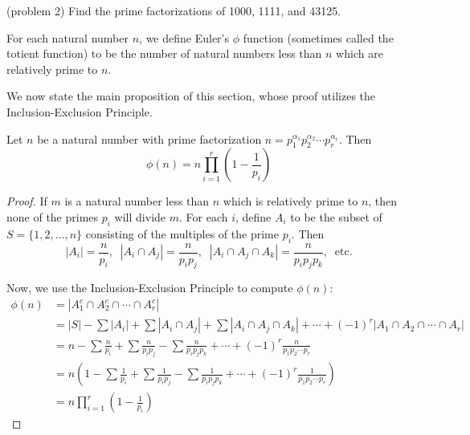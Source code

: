 \documentclass[handout]{ximera}
\begin{document}
\begin{problem}(problem 2)
Find the prime factorizations of 1000, 1111, and 43125.
\end{problem}
\begin{definition}
For each natural number $n$, we define Euler's $\phi$ function (sometimes called the totient function) to be the 
number of natural numbers less than $n$ which are relatively prime to $n$.
\end{definition}




We now state the main proposition of this section, whose proof utilizes the Inclusion-Exclusion Principle.





\begin{proposition}
Let $n$ be a natural number with prime factorization
$n = p_1^{\alpha_1}p_2^{\alpha_2} \cdots p_r^{\alpha_r}$.  Then
\[
\phi(n) = n \prod_{i = 1}^r \left(1 - \frac{1}{p_i}\right)
\]
\end{proposition}



\begin{proof}
If $m$ is a natural number less than $n$ which is relatively prime to $n$, 
then none of the primes $p_i$ will divide $m$.
For each $i$, define 
$A_i$ to be the subset of $S = \{1, 2, ..., n\}$ consisting of the multiples of the prime $p_i$.
Then
\[
|A_i| = \frac{n}{p_i}, \;\;|A_i \cap A_j| = \frac{n}{p_i p_j}, \;\;|A_i \cap A_j \cap A_k| = \frac{n}{p_i p_jp_k}, \;\;\text{etc.}
\]

Now, we use the Inclusion-Exclusion Principle to compute $\phi(n)$:
\begin{align*}
\phi(n) &= |A_1^c \cap A_2^c \cap \cdots \cap A_r^c|\\
&= |S| - \sum|A_i| + \sum|A_i \cap A_j| + \sum|A_i \cap A_j \cap A_k| + \cdots + (-1)^r|A_1 \cap A_2 \cap \cdots \cap A_r|\\[7pt]
&= n - \sum \frac{n}{p_i} + \sum \frac{n}{p_ip_j} - \sum \frac{n}{p_ip_jp_k} + \cdots + (-1)^r \frac{n}{p_1p_2 \cdots p_r}\\[7pt]
&= n\left(1 - \sum \frac{1}{p_i} + \sum \frac{1}{p_ip_j} - \sum \frac{1}{p_ip_jp_k} + \cdots + (-1)^r \frac{1}{p_1p_2 \cdots p_r} \right)\\[7pt]
&= n \prod_{i = 1}^r \left(1 - \frac{1}{p_i}\right)
\end{align*}
\end{proof}
\end{document}

